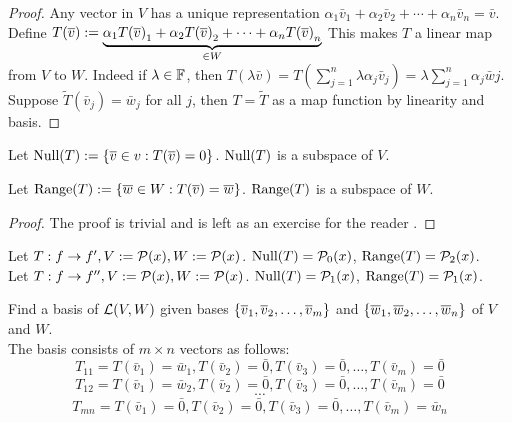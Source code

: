 \begin{proof}
    Any vector in $V$ has a unique representation $\alpha_1 \bar v_1 + \alpha_2\bar v_2 + \cdots + \alpha_n \bar v_n = \bar v$.  \\ Define $T(\overline v):= \underbrace{{\alpha}_1{T(\overline v)}_1 + {\alpha}_2{T(\overline v)}_2 + \cdots + {\alpha}_{n}{T(\overline v)}_{n}}_{\in W}$ This makes $T$ a linear map from $V$ to $W$. Indeed if $\lambda \in \mathbb F$, then $T(\lambda \bar v) = T(\sum_{j = 1}^n \lambda \alpha_j \bar v_j) = \lambda \sum_{j = 1}^n \alpha_j \bar wj$. Suppose $\tilde T(\bar v_j) = \bar w_j$ for all $j$, then $T = \tilde T$ as a map function by linearity and basis.
\end{proof}
\begin{theorem}
    Let $\text{Null} (T):= \left\{ \overline v \in  v : T(\overline v) = 0 \right\}$. $\text{Null} (T)$ is a subspace of $V$.
\end{theorem}
\begin{theorem}
    Let $\text{Range} (T):= \left\{ \overline w \in W : T(\overline v) = \overline w \right\}$. $\text{Range}(T)$ is a subspace of $W$.
\end{theorem}
\begin{proof}
    The proof is trivial and is left as an exercise for the reader .
\end{proof}
\begin{example}
    Let $T: f \to f', V:= \mathcal P(x), W:= \mathcal P(x)$. $\text{Null}(T) = \mathcal P_0(x)$, $\text{Range}(T) = \mathcal P_2(x)$. \\
    Let $T: f \to f'', V:= \mathcal P(x), W:= \mathcal P(x)$. $\text{Null}(T) = \mathcal P_1(x)$, $\text{Range}(T) = \mathcal P_1(x)$.
\end{example}
\begin{example}
    Find a basis of $\mathcal L (V,W)$ given bases $\left\{ {\overline v}_1,{\overline v}_2, \ldots, {\overline v}_{m} \right\}$ and $\left\{ {\overline w}_1,{\overline w}_2, \ldots, {\overline w}_{n} \right\}$ of $V$ and $W$. \\
    The basis consists of $m \times n$ vectors as follows: 
    \[T_{11} = T(\bar v_1) = \bar w_1, T(\bar v_2) = \bar 0, T(\bar v_3) = \bar 0, \ldots ,T(\bar v_m) = \bar 0\]
    \[T_{12} = T(\bar v_1) = \bar w_2, T(\bar v_2) = \bar 0, T(\bar v_3) = \bar 0, \ldots ,T(\bar v_m) = \bar 0\]
    \[ \cdots \]
    \[T_{mn} = T(\bar v_1) = \bar 0, T(\bar v_2) = \bar 0, T(\bar v_3) = \bar 0, \ldots ,T(\bar v_m) = \bar w_n\]
\end{example}
